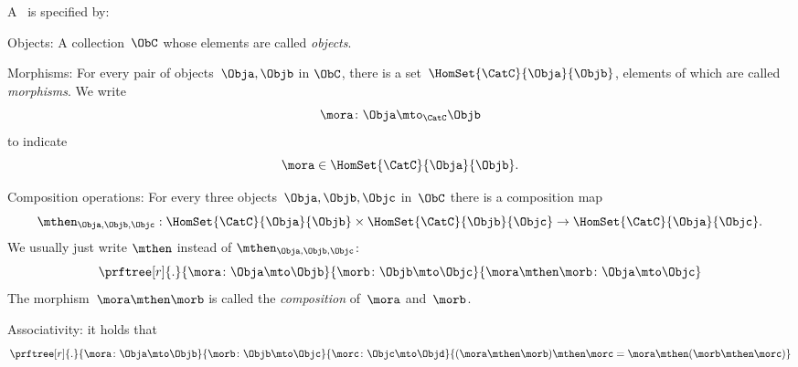 \begin{ctdefinition}[Semicategory]
	\label{def:semicategory-compact}
	A \emph{}~\CatC is specified by:
	\begin{body}
		\constit
		\begin{compactenum}
			\item Objects: A collection\footnotemark~$\ObC$ whose elements are called \emph{objects}.
			\item Morphisms: For every pair of objects~$\Obja,\Objb$ in $\ObC$, there is a set~$\HomSet{\CatC}{\Obja}{\Objb}$, elements of which are called \emph{morphisms}.
			We write
			\begin{equation}
				\mora \colon \Obja \mto_\CatC \Objb
			\end{equation}
			to indicate
			\begin{equation}
				\mora \in \HomSet{\CatC}{\Obja}{\Objb}.
			\end{equation}
			\item Composition operations: For every three objects~$\Obja,\Objb,\Objc$ in~$\ObC$ there is a composition map
			\begin{equation}
				\mthen_{\Obja,\Objb,\Objc}: \HomSet{\CatC}{\Obja}{\Objb} \times \HomSet{\CatC}{\Objb}{\Objc}\to \HomSet{\CatC}{\Obja}{\Objc}.
			\end{equation}
			We usually just write $\mthen$ instead of $\mthen_{\Obja,\Objb,\Objc}$:
			\begin{equation}
				\prftree[r]{.}{
					\mora \colon \Obja \mto \Objb
				}{
					\morb\colon \Objb \mto \Objc
				}{
					\mora \mthen \morb \colon \Obja \mto \Objc
				}
			\end{equation}
			The morphism~$\mora \mthen \morb$ is called the \emph{composition} of~$\mora$ and~$\morb$.
		\end{compactenum}
		\condit
		\begin{compactenum}
			\item Associativity: it holds that
			\begin{equation}
				\prftree[r]{.}{
					\mora\colon \Obja \mto \Objb
				}{
					\morb\colon \Objb \mto \Objc
				}{
					\morc\colon \Objc \mto \Objd
				}{
					(\mora\mthen \morb)
					\mthen \morc= \mora \mthen (\morb \mthen \morc)
				}
			\end{equation}
		\end{compactenum}
	\end{body}
\end{ctdefinition}


